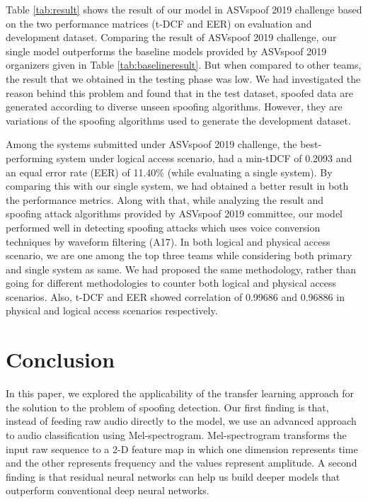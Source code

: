 \documentclass[a4paper]{article}
\begin{document}
    Table \ref{tab:result} shows the result of our model in ASVspoof 2019 challenge based on the two performance matrices (t-DCF and EER) on evaluation and development dataset. Comparing the result of ASVspoof 2019 challenge, our single model outperforms the baseline models provided by ASVspoof 2019 organizers given in Table \ref{tab:baselineresult}. But when compared to other teams, the result that we obtained in the testing phase was low. We had investigated the reason behind this problem and found that in the test dataset, spoofed data are generated according to diverse unseen spoofing algorithms. However, they are variations of the spoofing algorithms used to generate the development dataset.
    
     Among the systems submitted under ASVspoof 2019 challenge, the best-performing system under logical access scenario, had a min-tDCF of 0.2093 and an equal error rate (EER) of 11.40\% (while evaluating a single system). By comparing this with our single system, we had obtained a better result in both the performance metrics. Along with that, while analyzing the result and spoofing attack algorithms provided by ASVspoof 2019 committee, our model performed well in detecting spoofing attacks which uses voice conversion techniques by waveform filtering (A17). In both logical and physical access scenario, we are one among the top three teams while considering both primary and single system as same. We had proposed the same methodology, rather than going for different methodologies to counter both logical and physical access scenarios. Also, t-DCF and EER showed correlation of 0.99686 and 0.96886 in physical and logical access scenarios respectively.
    
\section{Conclusion}

   In this paper, we explored the applicability of the transfer learning approach for the solution to the problem of spoofing detection. Our first finding is that, instead of feeding raw audio directly to the model, we use an advanced approach to audio classification using Mel-spectrogram. Mel-spectrogram transforms the input raw sequence to a 2-D feature map in which one dimension represents time and the other represents frequency and the values represent amplitude. A second finding is that residual neural networks can help us build deeper models that outperform conventional deep neural networks. 
   
\end{document}
